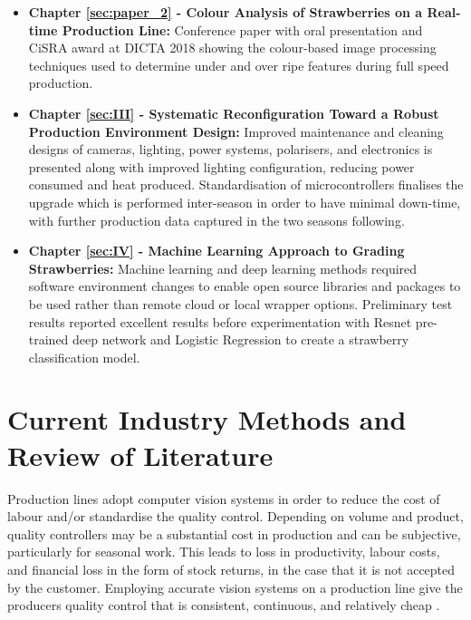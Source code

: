 \documentclass[fleqn,twoside,12pt]{report}
\begin{document}
\begin{itemize}
	\item \textbf{Chapter \ref{sec:paper_2} - Colour Analysis of Strawberries on a Real-time Production Line:} Conference paper with oral presentation and CiSRA award at DICTA 2018 showing the colour-based image processing techniques used to determine under and over ripe features during full speed production. 
	
	\item \textbf{Chapter \ref{sec:III} - Systematic Reconfiguration Toward a Robust Production Environment Design:} Improved maintenance and cleaning designs of cameras, lighting, power systems, polarisers, and electronics is presented along with improved lighting configuration, reducing power consumed and heat produced. Standardisation of microcontrollers finalises the upgrade which is performed inter-season in order to have minimal down-time, with further production data captured in the two seasons following.  
	
	\item \textbf{Chapter \ref{sec:IV} - Machine Learning Approach to Grading Strawberries:} Machine learning and deep learning methods required software environment changes to enable open source libraries and packages to be used rather than remote cloud or local wrapper options. Preliminary test results reported excellent results before experimentation with Resnet pre-trained deep network and Logistic Regression to create a strawberry classification model.  
	
	
\end{itemize}




\newpage

\chapter{Current Industry Methods and Review of Literature}
\label{sec:lit}

Production lines adopt computer vision systems in order to reduce the cost of labour and/or standardise the quality control. Depending on volume and product, quality controllers may be a substantial cost in production and can be subjective, particularly for seasonal work. This leads to loss in productivity, labour costs, and financial loss in the form of stock returns, in the case that it is not accepted by the customer. Employing accurate vision systems on a production line give the producers quality control that is consistent, continuous, and relatively cheap \cite{heleno,chen}. 
\end{document}
